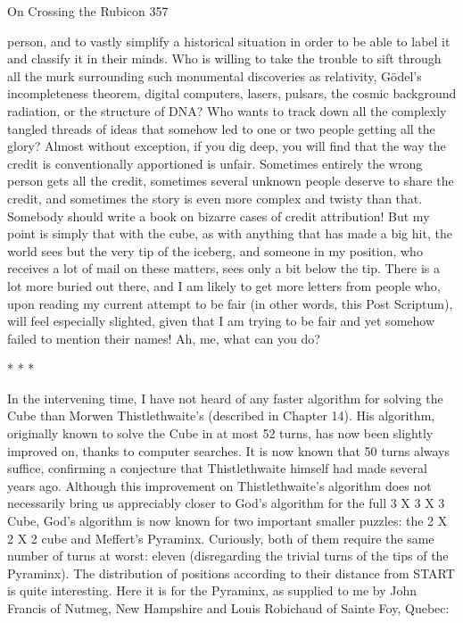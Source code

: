 On Crossing the Rubicon                                                              357

person, and to vastly simplify a historical situation in order to be able to label it
and classify it in their minds.
        Who is willing to take the trouble to sift through all the murk surrounding
such monumental discoveries as relativity, Gödel’s incompleteness theorem,
digital computers, lasers, pulsars, the cosmic background radiation, or the structure
of DNA? Who wants to track down all the complexly tangled threads of ideas that
somehow led to one or two people getting all the glory? Almost without exception,
if you dig deep, you will find that the way the credit is conventionally apportioned
is unfair. Sometimes entirely the wrong person gets all the credit, sometimes
several unknown people deserve to share the credit, and sometimes the story is
even more complex and twisty than that. Somebody should write a book on bizarre
cases of credit attribution!
        But my point is simply that with the cube, as with anything that has made a
big hit, the world sees but the very tip of the iceberg, and someone in my position,
who receives a lot of mail on these matters, sees only a bit below the tip. There is a
lot more buried out there, and I am likely to get more letters from people who,
upon reading my current attempt to be fair (in other words, this Post Scriptum),
will feel especially slighted, given that I am trying to be fair and yet somehow
failed to mention their names! Ah, me, what can you do?

                                      *   *   *

        In the intervening time, I have not heard of any faster algorithm for solving
the Cube than Morwen Thistlethwaite's (described in Chapter 14). His algorithm,
originally known to solve the Cube in at most 52 turns, has now been slightly
improved on, thanks to computer searches. It is now known that 50 turns always
suffice, confirming a conjecture that Thistlethwaite himself had made several years
ago.
        Although this improvement on Thistlethwaite's algorithm does not
necessarily bring us appreciably closer to God's algorithm for the full 3 X 3 X 3
Cube, God's algorithm is now known for two important smaller puzzles: the 2 X 2
X 2 cube and Meffert's Pyraminx. Curiously, both of them require the same
number of turns at worst: eleven (disregarding the trivial turns of the tips of the
Pyraminx). The distribution of positions according to their distance from START
is quite interesting. Here it is for the Pyraminx, as supplied to me by John Francis
of Nutmeg, New Hampshire and Louis Robichaud of Sainte Foy, Quebec:

